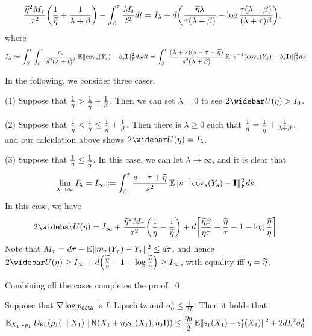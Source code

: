 \begin{align*}
    \frac{\wt{\eta}^2 M_\tau}{\tau^2}\prn*{\frac{1}{\wt{\eta}}+\frac{1}{\lambda+\beta}}-\int_{\beta}^\tau \frac{M_t}{t^2}dt
    =&~ I_\lambda +d\prn*{ \frac{\wt{\eta} \lambda}{\tau(\lambda+\beta)}-\log\frac{\tau(\lambda+\beta)}{(\lambda+\tau)\beta} },
\end{align*}
where
\begin{align*}
    I_\lambda \coloneqq \int_{\beta}^\tau \int_t^\tau \frac{c_s}{s^2(\lambda+t)^2} \operatorname{\mathbb{E}}\lVert\mathrm{cov}_s(Y_s)-b_s\mathbf{I}\rVert_{\mathrm{F}}^2 dsdt
    =\int_{\beta}^\tau \frac{(\lambda+s)(s-\tau+\widetilde{\eta})}{s^2(\lambda+\beta)} \operatorname{\mathbb{E}}\lVert s^{-1}(\mathrm{cov}_s(Y_s)-b_s\mathbf{I})\rVert_{\mathrm{F}}^2 ds.
\end{align*}

In the following, we consider three cases.

(1) Suppose that $\frac{1}{\eta}>\frac{1}{\widetilde{\eta}}+\frac{1}{\beta}$. Then we can set $\lambda=0$ to see $2\wb{U}(\eta)>I_0$. 

(2) Suppose that $\frac{1}{\widetilde{\eta}}<\frac{1}{\eta}\leq \frac{1}{\widetilde{\eta}}+\frac{1}{\beta}$. Then there is $\lambda\geq 0$ such that $\frac{1}{\eta}=\frac{1}{\widetilde{\eta}}+\frac{1}{\lambda+\beta}$, and our calculation above shows $2\wb{U}(\eta)=I_\lambda$.

(3) Suppose that $\frac{1}{\eta}\leq \frac{1}{\widetilde{\eta}}$. In this case, we can let $\lambda\to \infty$, and it is clear that
\begin{align*}
    \lim_{\lambda\to\infty} I_\lambda=I_\infty\coloneqq \int_{\beta}^\tau \frac{s-\tau+\widetilde{\eta}}{s^2} \operatorname{\mathbb{E}}\lVert s^{-1}\mathrm{cov}_s(Y_s)-\mathbf{I}\rVert_{\mathrm{F}}^2 ds.
\end{align*}
In this case, we have
\begin{align*}
    2\wb{U}(\eta)=I_\infty+\frac{\wt{\eta}^2M_\tau}{\tau^2}\prn*{\frac{1}{\eta}-\frac{1}{\wt{\eta}}}+d\brk*{ \frac{\wt{\eta}\beta}{\eta\tau}+\frac{\wt{\eta}}{\tau}-1-\log \frac{\wt{\eta}}{\eta} }.
\end{align*}
Note that $M_\tau=d\tau-\operatorname{\mathbb{E}}\lVert m_\tau(Y_\tau)-Y_\tau\rVert^2\leq d\tau$, and hence $2\wb{U}(\eta)\geq I_\infty+d\prn*{\frac{\wt{\eta}}{\eta}-1-\log \frac{\wt{\eta}}{\eta}}\geq I_\infty$, with equality iff $\eta=\widetilde{\eta}$. 

Combining all the cases completes the proof.
\qed

\begin{corollary}\label{cor:DDPM-p0}
Suppose that $\nabla \log p_{\mathsf{data}}$ is $L$-Lipschitz and $\sigma_0^2\leq \frac{1}{2L}$.
Then it holds that 
\begin{align*}
    \En_{X_{1}\sim p_{1}}\Dkl{\rho_1(\cdot\mid X_{1})}{\normal{ X_1 + \eta_0 \scf_{1}(X_1), \eta_0 \Id }}
    \leq \frac{\eta_0}{2}\En\nrm{\scf_1(X_1)-\scfs_1(X_1)}^2
    +2dL^2\sigma_0^4.
\end{align*}
\end{corollary}

